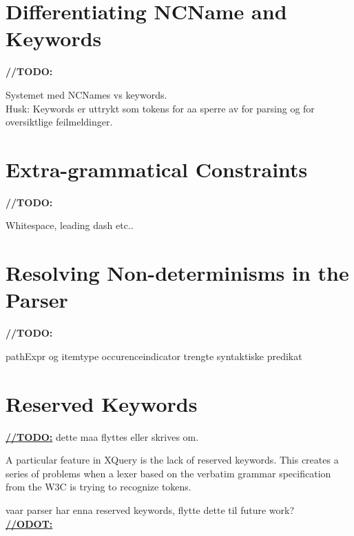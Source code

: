 \section{Differentiating NCName and Keywords}

\textbf{\LARGE //TODO:} 

Systemet med NCNames vs keywords. \\
Husk: Keywords er uttrykt som tokens for aa sperre av for parsing og for oversiktlige feilmeldinger.

\section{Extra-grammatical Constraints}

\textbf{\LARGE //TODO:} 

Whitespace, leading dash etc..

\section{Resolving Non-determinisms in the Parser }

\textbf{\LARGE //TODO:} 

pathExpr og itemtype occurenceindicator trengte syntaktiske predikat

\section{Reserved Keywords}

\underline{\textbf{\LARGE //TODO:}} dette maa flyttes eller skrives om.

A particular feature in XQuery is the lack of reserved keywords. This creates a
series of problems when a lexer based on the verbatim grammar specification from
the W3C is trying to recognize tokens. 

vaar parser har enna reserved keywords, flytte dette til future work? \\
\underline{\textbf{\LARGE //ODOT:}} 



